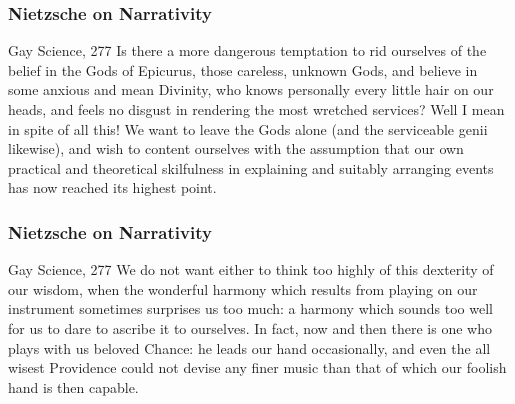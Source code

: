 \documentclass[xcolor=dvipsnames]{beamer}
\begin{document}
\begin{frame}
  \frametitle{Nietzsche on Narrativity}
  \begin{block}{Gay Science, 277}
    Is there a more dangerous temptation to rid ourselves of the
    belief in the Gods of Epicurus, those careless, unknown Gods, and
    believe in some anxious and mean Divinity, who knows personally
    every little hair on our heads, and feels no disgust in rendering
    the most wretched services? Well I mean in spite of all this! We
    want to leave the Gods alone (and the serviceable genii likewise),
    and wish to content ourselves with the assumption that our own
    practical and theoretical skilfulness in explaining and suitably
    arranging events has now reached its highest point.
  \end{block}
\end{frame}

\begin{frame}
  \frametitle{Nietzsche on Narrativity}
  \begin{block}{Gay Science, 277}
    We do not want either to think too highly of this dexterity of our
    wisdom, when the wonderful harmony which results from playing on
    our instrument sometimes surprises us too much: a harmony which
    sounds too well for us to dare to ascribe it to ourselves. In
    fact, now and then there is one who plays with us beloved Chance:
    he leads our hand occasionally, and even the all wisest Providence
    could not devise any finer music than that of which our foolish
    hand is then capable.
  \end{block}
\end{frame}

\end{document}
